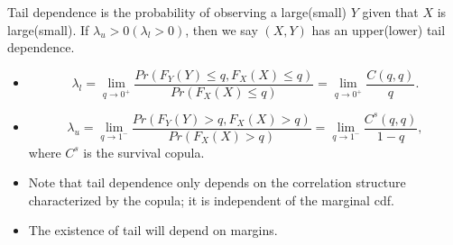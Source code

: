 \begin{refsection}
\begin{definition}
Tail dependence is the probability of observing a large(small) $Y$ given that $X$ is large(small). If $\lambda_u > 0(\lambda_l > 0)$, then we say $(X,Y)$ has an upper(lower) tail dependence. 
\end{definition}

\begin{lemma}\hfill
\begin{itemize}
	\item 
	$$\lambda_l = \lim_{q\to 0^+} \frac{ Pr(F_Y(Y) \leq q , F_X(X) \leq q)}{Pr(F_X(X) \leq q)} = \lim_{q\to 0^+} \frac{C(q,q)}{q}.$$
	\item 
	$$\lambda_u = \lim_{q\to 1^-} \frac{ Pr(F_Y(Y) > q , F_X(X) > q)}{Pr(F_X(X) > q)} = \lim_{q\to 1^-} \frac{C^s(q,q)}{1-q},$$
	where $C^s$ is the survival copula.
\end{itemize}	
\end{lemma}

\begin{remark}\hfill
\begin{itemize}
	\item 	Note that tail dependence only depends on the correlation structure characterized by the copula; it is independent of the marginal cdf.
	\item The existence of tail will depend on margins.
\end{itemize}	
	
\end{remark}



\end{refsection}
